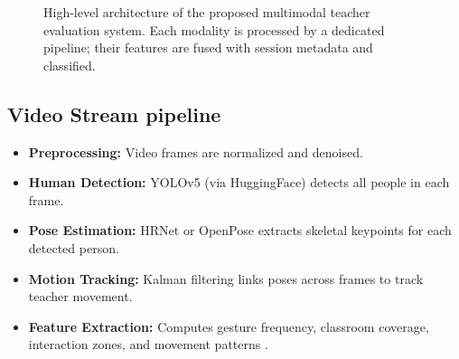 \begin{figure}[ht]
    \centering
    \caption{High-level architecture of the proposed multimodal teacher evaluation system. Each modality is processed by a dedicated pipeline; their features are fused with session metadata and classified.}
    \label{fig:multimodal_architecture}
\end{figure}

\subsection{Video Stream pipeline}  
\begin{itemize}
    \item \textbf{Preprocessing:} Video frames are normalized and denoised.
    \item \textbf{Human Detection:} YOLOv5 (via HuggingFace) detects all people in each frame.
    \item \textbf{Pose Estimation:} HRNet or OpenPose extracts skeletal keypoints for each detected person.
    \item \textbf{Motion Tracking:} Kalman filtering links poses across frames to track teacher movement.
    \item \textbf{Feature Extraction:} Computes gesture frequency, classroom coverage, interaction zones, and movement patterns \cite{mcneill1992hand}.
\end{itemize}

